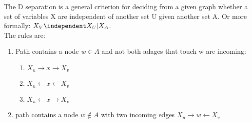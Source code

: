  The D separation is a general criterion for deciding from a given graph whether a set of variables X are independent of another set U given another set A. Or more formally: $X_V \independent X_U | X_A$.\\The rules are:\\
    \begin{enumerate}
                \item Path contains a node $w \in A$ and not both adages that touch w are incoming:
                \begin{enumerate}
                    \item $X_u \rightarrow x \rightarrow X_v$
                    \item $X_u \leftarrow x \leftarrow X_v$
                    \item $X_u \leftarrow x \rightarrow X_v$
                \end{enumerate}
                \item path contains a node $w\notin A$ with two incoming edges $X_u \rightarrow w \leftarrow X_v$
            \end{enumerate}
            